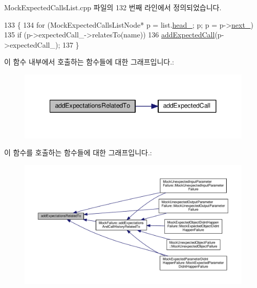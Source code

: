 Mock\+Expected\+Calls\+List.\+cpp 파일의 132 번째 라인에서 정의되었습니다.


\begin{DoxyCode}
133 \{
134     \textcolor{keywordflow}{for} (MockExpectedCallsListNode* p = list.\hyperlink{class_mock_expected_calls_list_a18290c3c0a206882dd8e0d9f446e2fe6}{head\_}; p; p = p->\hyperlink{class_mock_expected_calls_list_1_1_mock_expected_calls_list_node_aaae452a372ae14c06a6d5d252df73725}{next\_})
135         \textcolor{keywordflow}{if} (p->expectedCall\_->relatesTo(name))
136             \hyperlink{class_mock_expected_calls_list_a93aa2234c01260b1e76ceef59f8cfaee}{addExpectedCall}(p->expectedCall\_);
137 \}
\end{DoxyCode}


이 함수 내부에서 호출하는 함수들에 대한 그래프입니다.\+:
\nopagebreak
\begin{figure}[H]
\begin{center}
\leavevmode
\includegraphics[width=341pt]{class_mock_expected_calls_list_a462f63288f7f9ae4b33d0b5d0eca265e_cgraph}
\end{center}
\end{figure}




이 함수를 호출하는 함수들에 대한 그래프입니다.\+:
\nopagebreak
\begin{figure}[H]
\begin{center}
\leavevmode
\includegraphics[width=350pt]{class_mock_expected_calls_list_a462f63288f7f9ae4b33d0b5d0eca265e_icgraph}
\end{center}
\end{figure}


